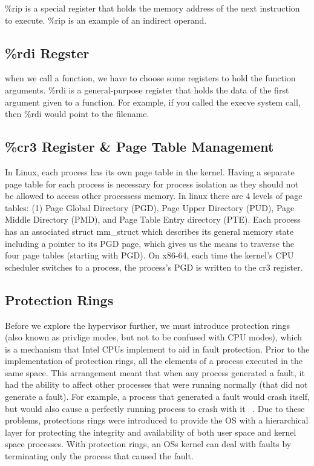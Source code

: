 \documentclass{report}
\begin{document}
\begin{spacing}{1.5}
{\large
\%rip is a special register that holds the memory address of the next instruction to execute. \%rip is an example of an indirect operand.
\newline
}


\subsection{\%rdi Regster}

{\large
when we call a function, we have to choose some registers to hold the function arguments. \%rdi is a general-purpose register that holds the data of the first argument given to a function. For example, if you called the execve system call, then \%rdi would point to the filename.
\newline
}


\subsection{\%cr3 Register \& Page Table Management}

{\large
In Linux, each process has its own page table in the kernel. Having a separate page table for each process is necessary for process isolation as they should not be allowed to access other processess memory. In linux there are 4 levels of page tables: (1) Page Global Directory (PGD), Page Upper Directory (PUD), Page Middle Directory (PMD), and Page Table Entry directory (PTE). Each process has an associated struct mm\_struct which describes its general memory state including a pointer to its PGD page, which gives us the means to traverse the four page tables (starting with PGD). On x86-64, each time the kernel's CPU scheduler  switches to a process, the process's PGD is written to the cr3 register.
\newline
}


\subsection{Protection Rings}

{\large
Before we explore the hypervisor further, we must introduce protection rings (also known as privlige modes, but not to be confused with CPU modes), which is a mechanism that Intel CPUs implement to aid in fault protection. Prior to the implementation of protection rings, all the elements of a process executed in the same space. This arrangement meant that when any process generated a fault, it had the ability to affect other processes that were running normally (that did not generate a fault). For example, a process that generated a fault would crash itself, but would also cause a perfectly running process to crash with it ~\cite{Wiley2011}. Due to these problems, protections rings were introduced to provide the OS with a hierarchical layer for protecting the integrity and availability of both user space and kernel space processes. With protection rings, an OSs kernel can deal with faults by terminating only the process that caused the fault. 
\newline
}


\end{spacing}
\end{document}

